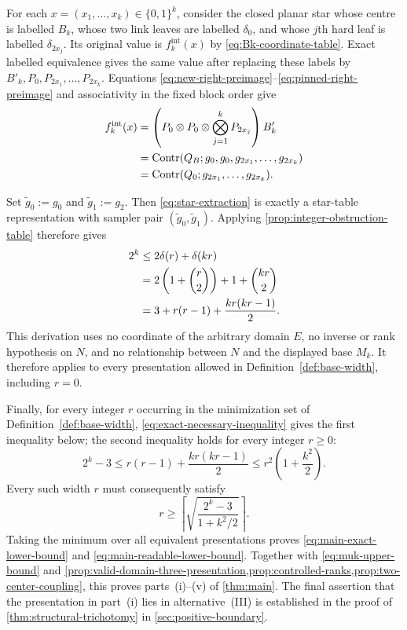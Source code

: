 \documentclass[11pt]{article}
\theoremstyle{definition}
\theoremstyle{remark}
\newcommand{\bits}{\{0,1\}}
\newcommand{\Contr}{\operatorname{Contr}}
\begin{document}
For each $x=(x_1,\ldots,x_k)\in\bits^k$, consider the closed planar star whose
centre is labelled $B_k$, whose two link leaves are labelled $\delta_0$,
and whose $j$th hard leaf is labelled $\delta_{2x_j}$.  Its original value
is $f_k^{\mathrm{int}}(x)$ by \eqref{eq:Bk-coordinate-table}.  Exact
labelled equivalence gives the same value after replacing these labels by
$B'_k,P_0,P_{2x_1},\ldots,P_{2x_k}$.  Equations
\eqref{eq:new-right-preimage}--\eqref{eq:pinned-right-preimage} and
associativity in the fixed block order give
\begin{align}
  f_k^{\mathrm{int}}(x)
  &=\left(P_0\otimes P_0\otimes
      \bigotimes_{j=1}^kP_{2x_j}\right)B'_k
  \notag\\
  &=\Contr(Q_B;g_0,g_0,g_{2x_1},\ldots,g_{2x_k})
  \notag\\
  &=\Contr(Q_0;g_{2x_1},\ldots,g_{2x_k}).
  \label{eq:star-extraction}
\end{align}

Set $\widetilde g_0:=g_0$ and $\widetilde g_1:=g_2$.  Then
\eqref{eq:star-extraction} is exactly a star-table representation with
sampler pair $(\widetilde g_0,\widetilde g_1)$.  Applying
\cref{prop:integer-obstruction-table} therefore gives
\begin{align}
  2^k
  &\le 2\delta(r)+\delta(kr)
  \notag\\
  &=2\left(1+\binom r2\right)
    +1+\binom{kr}{2}
  \notag\\
  &=3+r(r-1)+\frac{kr(kr-1)}{2}.
  \label{eq:exact-necessary-inequality}
\end{align}
This derivation uses no coordinate of the arbitrary domain $E$, no inverse
or rank hypothesis on $N$, and no relationship between $N$ and the
displayed base $M_k$.  It therefore applies to every presentation allowed
in Definition~\ref{def:base-width}, including $r=0$.

Finally, for every integer $r$ occurring in the minimization set of
Definition~\ref{def:base-width},
\eqref{eq:exact-necessary-inequality} gives the first inequality below; the
second inequality holds for every integer $r\ge0$:
\begin{equation}
  2^k-3
  \le r(r-1)+\frac{kr(kr-1)}2
  \le r^2\left(1+\frac{k^2}{2}\right).
  \label{eq:readable-inequality-derivation}
\end{equation}
Every such width $r$ must consequently satisfy
\begin{equation}
  r
  \ge
  \left\lceil
    \sqrt{\frac{2^k-3}{1+k^2/2}}
  \right\rceil.
  \label{eq:all-r-lower-bound}
\end{equation}
Taking the minimum over all equivalent presentations proves
\eqref{eq:main-exact-lower-bound} and
\eqref{eq:main-readable-lower-bound}.  Together with
\eqref{eq:muk-upper-bound} and
\cref{prop:valid-domain-three-presentation,prop:controlled-ranks,prop:two-center-coupling},
this proves parts~\textup{(i)}--\textup{(v)} of \cref{thm:main}.  The final
assertion that the presentation in part~\textup{(i)} lies in
alternative~\textup{(III)}
is established in the proof of \cref{thm:structural-trichotomy} in
\cref{sec:positive-boundary}.
\end{document}
